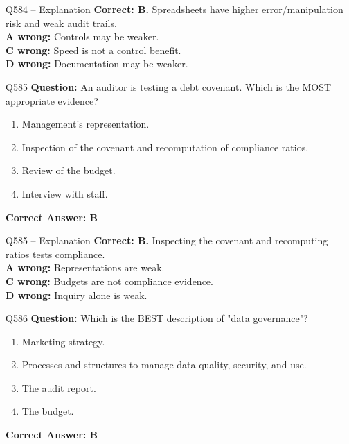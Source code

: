 \documentclass[aspectratio=169,10pt]{beamer}
\begin{document}
	\begin{frame}[t]{Q584 -- Explanation}
		\small
		\textbf{Correct: B.} Spreadsheets have higher error/manipulation risk and weak audit trails. \\[4pt]
		\textbf{A wrong:} Controls may be weaker. \\[2pt]
		\textbf{C wrong:} Speed is not a control benefit. \\[2pt]
		\textbf{D wrong:} Documentation may be weaker.
	\end{frame}
	
	\begin{frame}[t]{Q585}
		\small
		\textbf{Question:} An auditor is testing a debt covenant. Which is the MOST appropriate evidence?
		\begin{enumerate}[label=\Alph*.,itemsep=1pt,topsep=2pt]
			\item Management's representation.
			\item Inspection of the covenant and recomputation of compliance ratios.
			\item Review of the budget.
			\item Interview with staff.
		\end{enumerate}
		\vspace{4pt}
		\textbf{Correct Answer: B}
	\end{frame}
	
	\begin{frame}[t]{Q585 -- Explanation}
		\small
		\textbf{Correct: B.} Inspecting the covenant and recomputing ratios tests compliance. \\[4pt]
		\textbf{A wrong:} Representations are weak. \\[2pt]
		\textbf{C wrong:} Budgets are not compliance evidence. \\[2pt]
		\textbf{D wrong:} Inquiry alone is weak.
	\end{frame}
	
	\begin{frame}[t]{Q586}
		\small
		\textbf{Question:} Which is the BEST description of "data governance"?
		\begin{enumerate}[label=\Alph*.,itemsep=1pt,topsep=2pt]
			\item Marketing strategy.
			\item Processes and structures to manage data quality, security, and use.
			\item The audit report.
			\item The budget.
		\end{enumerate}
		\vspace{4pt}
		\textbf{Correct Answer: B}
	\end{frame}
	
\end{document}
